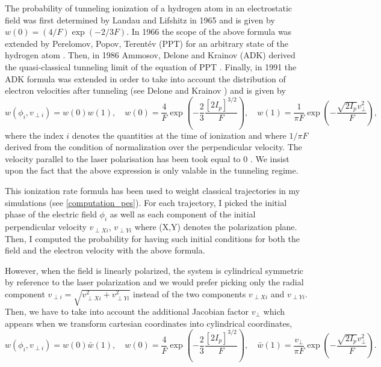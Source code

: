 \documentclass[a4paper]{article}
\begin{document}
The probability of tunneling ionization of a hydrogen atom in an electrostatic field was first determined by Landau and Lifshitz in 1965 \cite{Landau_1965} and is given by $w(0)=(4/F)\exp(-2/3F)$. In 1966 the scope of the above formula was extended by Perelomov, Popov, Terent\'ev (PPT) for an arbitrary state of the hydrogen atom \cite{PPT_1966}. Then, in 1986 Ammosov, Delone and Krainov (ADK) derived the quasi-classical tunneling limit of the equation of PPT \cite{ADK_1986}. Finally, in 1991 the ADK formula was extended in order to take into account the distribution of electron velocities after tunneling (see Delone and Krainov \cite{Delone_1991}) and is given by
\begin{equation} 
\label{ADK_distribution}
w(\phi_{i},v_{\perp i})=w(0)w(1), \quad w(0)=\frac{4}{F}\exp(-\frac{2}{3}\frac{[2I_{p}]^{3/2}}{F}), \quad w(1)=\frac{1}{\pi F}\exp(-\frac{\sqrt{2I_{p}}v_{\perp}^{2}}{F}),
\end{equation}
where the index $i$ denotes the quantities at the time of ionization and where $1/\pi F$ derived from the condition of normalization over the perpendicular velocity. 
The velocity parallel to the laser polarisation has been took equal to 0 \cite{Hu_1997}. We insist upon the fact that the above expression is only valable in the tunneling regime.
\par
This ionization rate formula has been used to weight classical trajectories in my simulations (see \ref{computation_pes}). For each trajectory, I picked the initial phase of the electric field $\phi_{i}$ as well as each component of the initial perpendicular velocity $v_{\perp X i}$, $v_{\perp Y i}$ where (X,Y) denotes the polarization plane. Then, I computed the probability for having such initial conditions for both the field and the electron velocity with the above formula.
\par
However, when the field is linearly polarized, the system is cylindrical symmetric by reference to the laser polarization and we would prefer picking only the radial component $v_{\perp i}=\sqrt{v_{\perp X i}^{2} + v_{\perp Y i}^{2}}$ instead of the two components $v_{\perp X i}$ and $v_{\perp Y i}$. Then, we have to take into account the additional Jacobian factor $v_{\perp}$ which appears when we transform cartesian coordinates into cylindrical coordinates,
\begin{equation}
w(\phi_{i},v_{\perp i})=w(0)\bar w(1), \quad w(0)=\frac{4}{F}\exp(-\frac{2}{3}\frac{[2I_{p}]^{3/2}}{F}), \quad \bar w(1)=\frac{v_{\perp}}{\pi F}\exp(-\frac{\sqrt{2I_{p}}v_{\perp}^{2}}{F}).
\end{equation}
\end{document}

